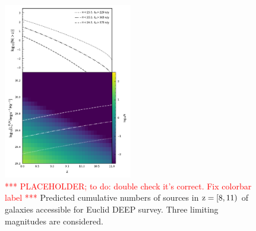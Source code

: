 \begin{figure}
	\centering
	\includegraphics[width=0.5\textwidth]{figures/density/density.pdf}
	\caption{\textcolor{red}{*** PLACEHOLDER; to do: double check it's correct. Fix colorbar label *** }{Predicted cumulative numbers of sources in $\rm z = [8, 11)$ of galaxies accessible for Euclid DEEP survey. Three limiting magnitudes are considered.} 
	\label{fig:density:lfe}}
\end{figure}